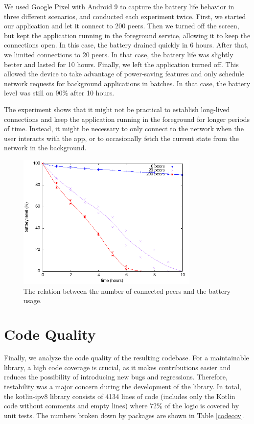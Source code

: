 We used Google Pixel with Android 9 to capture the battery life behavior in three different scenarios, and conducted each experiment twice. First, we started our application and let it connect to 200 peers. Then we turned off the screen, but kept the application running in the foreground service, allowing it to keep the connections open. In this case, the battery drained quickly in 6 hours. After that, we limited connections to 20 peers. In that case, the battery life was slightly better and lasted for 10 hours. Finally, we left the application turned off. This allowed the device to take advantage of power-saving features and only schedule network requests for background applications in batches. In that case, the battery level was still on 90\% after 10 hours.

The experiment shows that it might not be practical to establish long-lived connections and keep the application running in the foreground for longer periods of time. Instead, it might be necessary to only connect to the network when the user interacts with the app, or to occasionally fetch the current state from the network in the background.

\begin{figure}[h!]
    \centering
    \includegraphics[width=0.8\textwidth]{plots/battery}
    \caption{The relation between the number of connected peers and the battery usage.}
    \label{battery}
\end{figure}

\section{Code Quality}

Finally, we analyze the code quality of the resulting codebase. For a maintainable library, a high code coverage is crucial, as it makes contributions easier and reduces the possibility of introducing new bugs and regressions. Therefore, testability was a major concern during the development of the library. In total, the kotlin-ipv8 library consists of 4134 lines of code (includes only the Kotlin code without comments and empty lines) where 72\% of the logic is covered by unit tests. The numbers broken down by packages are shown in Table \ref{codecov}.

